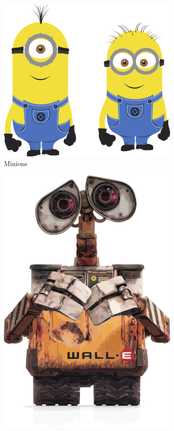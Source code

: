 \begin{figure}[htb]
  \centering
  \begin{subfigure}[t]{0.49\linewidth}
    \includegraphics[width=\linewidth]{minion}
    \caption{Minions}
    \label{fig:minion}
  \end{subfigure}%
  \hfill
  \begin{subfigure}[t]{0.49\linewidth}
    \includegraphics[width=\linewidth]{WallE}

\end{subfigure}
\end{figure}
